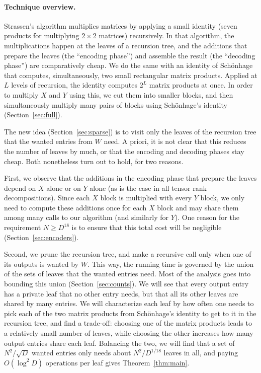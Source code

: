 \paragraph{Technique overview.}
Strassen's algorithm multiplies matrices by applying a small identity (seven products for multiplying $2\times2$ matrices) recursively. In that algorithm, the multiplications happen at the leaves of a recursion tree, and the additions that prepare the leaves (the ``encoding phase'') and assemble the result (the ``decoding phase'') are comparatively cheap. We do the same with an identity of Sch\"onhage that computes, simultaneously, two small rectangular matrix products. Applied at $L$ levels of recursion, the identity computes $2^L$ matrix products at once. In order to multiply $X$ and $Y$ using this, we cut them into smaller blocks, and then simultaneously multiply many pairs of blocks using Sch\"onhage's identity (Section~\ref{sec:full}).

The new idea (Section~\ref{sec:sparse}) is to visit only the leaves of the recursion tree that the wanted entries from $W$ need. A priori, it is not clear that this reduces the number of leaves by much, or that the encoding and decoding phases stay cheap. Both nonetheless turn out to hold, for two reasons.

First, we observe that the additions in the encoding phase that prepare the leaves depend on $X$ alone or on $Y$ alone (as is the case in all tensor rank decompositions). Since each $X$ block is multiplied with every $Y$ block, we only need to compute these additions once for each $X$ block and may share them among many calls to our algorithm (and similarly for $Y$). One reason for the requirement $N\ge D^{18}$ is to ensure that this total cost will be negligible (Section~\ref{sec:encoders}).

Second, we prune the recursion tree, and make a recursive call only when one of its outputs is wanted by $W$. This way, the running time is governed by the union of the sets of leaves that the wanted entries need. Most of the analysis goes into bounding this union (Section~\ref{sec:counts}). We will see that every output entry has a private leaf that no other entry needs, but that all its other leaves are shared by many entries. We will characterize each leaf by how often one needs to pick each of the two matrix products from Sch\"onhage's identity to get to it in the recursion tree, and find a trade-off: choosing one of the matrix products leads to a relatively small number of leaves, while choosing the other increases how many output entries share each leaf. Balancing the two, we will find that a set of $N^2/\sqrt D$ wanted entries only needs about $N^2/D^{1/18}$ leaves in all, and paying $O(\log^2\!D)$ operations per leaf gives Theorem~\ref{thm:main}.

